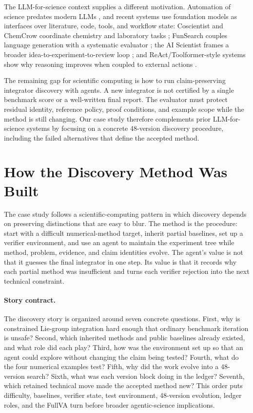 \documentclass[10pt]{article}
\begin{document}
The LLM-for-science context supplies a different motivation. Automation of
science predates modern LLMs \citep{King2009AutomationScience}, and recent
systems use foundation models as interfaces over literature, code, tools, and
workflow state: Coscientist and ChemCrow coordinate chemistry and laboratory
tasks \citep{Boiko2023Coscientist,Bran2024ChemCrow}; FunSearch couples language
generation with a systematic evaluator
\citep{RomeraParedes2024FunSearch}; the AI Scientist frames a broader
idea-to-experiment-to-review loop \citep{Lu2024AIScientist}; and
ReAct/Toolformer-style systems show why reasoning improves when coupled to
external actions \citep{Yao2023ReAct,Schick2023Toolformer}.

The remaining gap for scientific computing is how to run claim-preserving
integrator discovery with agents. A new integrator is not certified by a
single benchmark score or a well-written final report. The evaluator must
protect residual identity, reference policy, proof conditions, and example
scope while the method is still changing. Our case study therefore complements
prior LLM-for-science systems by focusing on a concrete 48-version discovery
procedure, including the failed alternatives that define the accepted method.

\section{How the Discovery Method Was Built}

The case study follows a scientific-computing pattern in which discovery
depends on preserving distinctions that are easy to blur. The method is the
procedure: start with a difficult numerical-method target, inherit partial
baselines, set up a verifier environment, and use an agent to maintain the
experiment tree while method, problem, evidence, and claim identities evolve.
The agent's value is not that it guesses the final integrator in one step. Its
value is that it records why each partial method was insufficient and turns each
verifier rejection into the next technical constraint.

\paragraph{Story contract.}
The discovery story is organized around seven concrete questions. First, why is
constrained Lie-group integration hard enough that ordinary benchmark
iteration is unsafe? Second, which inherited methods and public baselines
already existed, and what role did each play? Third, how was the environment
set up so that an agent could explore without changing the claim being tested?
Fourth, what do the four numerical examples test? Fifth, why did the work
evolve into a 48-version search? Sixth, what was each version block doing in
the ledger? Seventh, which retained technical move made the accepted method
new? This order puts difficulty, baselines, verifier state, test environment,
48-version evolution, ledger roles, and the FullVA turn before broader
agentic-science implications.
\end{document}
